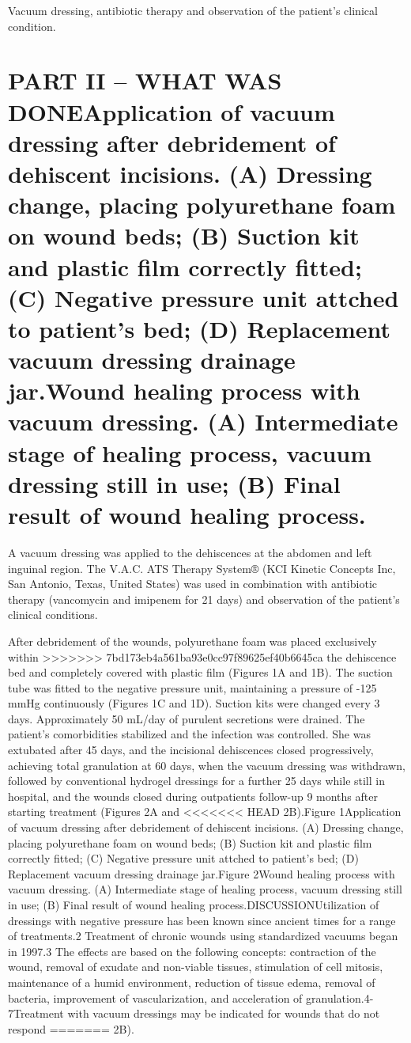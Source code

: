 \documentclass[numberinsection,times,10pt,spreadimages]{memoir}
\begin{document}
Vacuum dressing, antibiotic therapy and observation of the patient’s
clinical condition.

\section{PART II – WHAT WAS DONEApplication of vacuum dressing after debridement
of dehiscent
incisions. (A) Dressing change, placing polyurethane foam on wound beds;
(B) Suction kit and plastic film correctly fitted; (C) Negative pressure
unit attched to patient’s bed; (D) Replacement vacuum dressing drainage
jar.Wound healing process with vacuum dressing. (A) Intermediate stage of
healing process, vacuum dressing still in use; (B) Final result of wound
healing process.}

A vacuum dressing was applied to the dehiscences at the abdomen and left
inguinal
region. The V.A.C. ATS Therapy System® (KCI Kinetic Concepts Inc, San Antonio,
Texas, United States) was used in combination with antibiotic therapy
(vancomycin and imipenem for 21 days) and observation of the patient’s clinical
conditions.

After debridement of the wounds, polyurethane foam was placed exclusively within
>>>>>>> 7bd173eb4a561ba93e0cc97f89625ef40b6645ca
the dehiscence bed and completely covered with plastic film (Figures 1A and 1B).
The suction tube was fitted to the negative
pressure unit, maintaining a pressure of -125 mmHg continuously (Figures 1C and
1D). Suction kits were changed every 3 days.
Approximately 50 mL/day of purulent secretions were drained. The patient’s
comorbidities stabilized and the infection was controlled. She was extubated
after 45 days, and the incisional dehiscences closed progressively, achieving
total granulation at 60 days, when the vacuum dressing was withdrawn, followed
by conventional hydrogel dressings for a further 25 days while still in
hospital, and the wounds closed during outpatients follow-up 9 months after
starting treatment (Figures 2A and
<<<<<<< HEAD
2B).Figure 1Application of vacuum dressing after debridement of dehiscent
incisions. (A) Dressing change, placing polyurethane foam on wound beds;
(B) Suction kit and plastic film correctly fitted; (C) Negative pressure
unit attched to patient’s bed; (D) Replacement vacuum dressing drainage
jar.Figure 2Wound healing process with vacuum dressing. (A) Intermediate stage
of
healing process, vacuum dressing still in use; (B) Final result of wound
healing process.DISCUSSIONUtilization of dressings with negative pressure has
been known since ancient
times for a range of treatments.2 Treatment of chronic wounds using standardized
vacuums
began in 1997.3 The effects
are based on the following concepts: contraction of the wound, removal of
exudate and non-viable tissues, stimulation of cell mitosis, maintenance of a
humid environment, reduction of tissue edema, removal of bacteria, improvement
of vascularization, and acceleration of granulation.4-7Treatment with vacuum
dressings may be indicated for wounds that do not respond
=======
2B).
\end{document}
